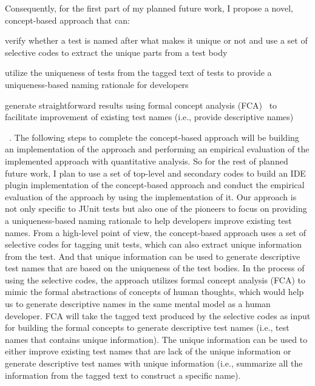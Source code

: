 Consequently, for the first part of my planned future work, I propose a novel, concept-based approach that can:
%
\begin{enumerate*}
\item verify whether a test is named after what makes it unique or not and use a set of selective codes to extract the unique parts from a test body
\item utilize the uniqueness of tests from the tagged text of tests to provide a uniqueness-based naming rationale for developers
\item generate straightforward results using formal concept analysis (FCA)~\cite{ganter2012formal} to facilitate improvement of existing test names (i.e., provide descriptive names)
\end{enumerate*}~\cite{emp-study}.
%
The following steps to complete the concept-based approach will be building an implementation of the approach and performing an empirical evaluation of the implemented approach with quantitative analysis.
%
So for the rest of planned future work, I plan to use a set of top-level and secondary codes to build an IDE plugin implementation of the concept-based approach and conduct the empirical evaluation of the approach by using the implementation of it.
%
Our approach is not only specific to JUnit tests but also one of the pioneers to focus on providing a uniqueness-based naming rationale to help developers improve existing test names.
%
From a high-level point of view, the concept-based approach uses a set of selective codes for tagging unit tests, which can also extract unique information from the test.
%
And that unique information can be used to generate descriptive test names that are based on the uniqueness of the test bodies.
%
In the process of using the selective codes, the approach utilizes formal concept analysis (FCA) to mimic the formal abstractions of concepts of human thoughts, which would help us to generate descriptive names in the same mental model as a human developer.
%
FCA will take the tagged text produced by the selective codes as input for building the formal concepts to generate descriptive test names (i.e., test names that contains unique information).
%
The unique information can be used to either improve existing test names that are lack of the unique information or generate descriptive test names with unique information (i.e., summarize all the information from the tagged text to construct a specific name).


